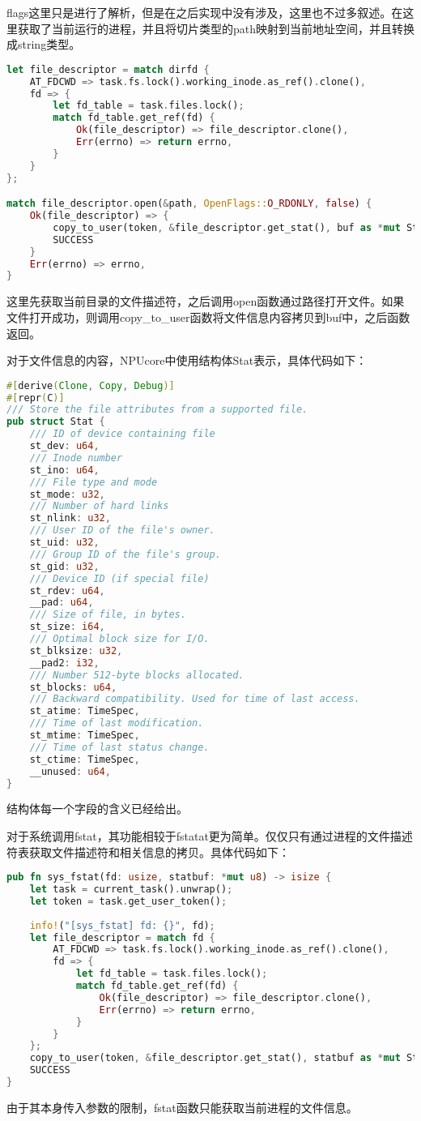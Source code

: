 flags这里只是进行了解析，但是在之后实现中没有涉及，这里也不过多叙述。在这里获取了当前运行的进程，并且将切片类型的path映射到当前地址空间，并且转换成string类型。

\begin{lstlisting}[language={Rust}, label={code:fstatat part2},
	caption={fstatat_part2}]
let file_descriptor = match dirfd {
	AT_FDCWD => task.fs.lock().working_inode.as_ref().clone(),
	fd => {
		let fd_table = task.files.lock();
		match fd_table.get_ref(fd) {
			Ok(file_descriptor) => file_descriptor.clone(),
			Err(errno) => return errno,
		}
	}
};

match file_descriptor.open(&path, OpenFlags::O_RDONLY, false) {
	Ok(file_descriptor) => {
		copy_to_user(token, &file_descriptor.get_stat(), buf as *mut Stat);
		SUCCESS
	}
	Err(errno) => errno,
}
\end{lstlisting}

这里先获取当前目录的文件描述符，之后调用open函数通过路径打开文件。如果文件打开成功，则调用copy_to_user函数将文件信息内容拷贝到buf中，之后函数返回。

对于文件信息的内容，NPUcore中使用结构体Stat表示，具体代码如下：
\begin{lstlisting}[language={Rust}, label={code:Stat},
	caption={Stat}]
#[derive(Clone, Copy, Debug)]
#[repr(C)]
/// Store the file attributes from a supported file.
pub struct Stat {
	/// ID of device containing file
	st_dev: u64,
	/// Inode number
	st_ino: u64,
	/// File type and mode   
	st_mode: u32,
	/// Number of hard links
	st_nlink: u32,
	/// User ID of the file's owner.
	st_uid: u32,
	/// Group ID of the file's group.
	st_gid: u32,
	/// Device ID (if special file)
	st_rdev: u64,
	__pad: u64,
	/// Size of file, in bytes.
	st_size: i64,
	/// Optimal block size for I/O.
	st_blksize: u32,
	__pad2: i32,
	/// Number 512-byte blocks allocated.
	st_blocks: u64,
	/// Backward compatibility. Used for time of last access.
	st_atime: TimeSpec,
	/// Time of last modification.
	st_mtime: TimeSpec,
	/// Time of last status change.
	st_ctime: TimeSpec,
	__unused: u64,
}
\end{lstlisting}

结构体每一个字段的含义已经给出。

对于系统调用fstat，其功能相较于fstatat更为简单。仅仅只有通过进程的文件描述符表获取文件描述符和相关信息的拷贝。具体代码如下：

\begin{lstlisting}[language={Rust}, label={code:fstat},
	caption={fstat}]
pub fn sys_fstat(fd: usize, statbuf: *mut u8) -> isize {
	let task = current_task().unwrap();
	let token = task.get_user_token();
	
	info!("[sys_fstat] fd: {}", fd);
	let file_descriptor = match fd {
		AT_FDCWD => task.fs.lock().working_inode.as_ref().clone(),
		fd => {
			let fd_table = task.files.lock();
			match fd_table.get_ref(fd) {
				Ok(file_descriptor) => file_descriptor.clone(),
				Err(errno) => return errno,
			}
		}
	};
	copy_to_user(token, &file_descriptor.get_stat(), statbuf as *mut Stat);
	SUCCESS
}
\end{lstlisting}

由于其本身传入参数的限制，fstat函数只能获取当前进程的文件信息。